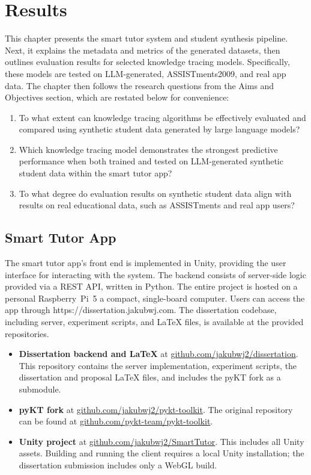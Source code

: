 \chapter{Results}

This chapter presents the smart tutor system and student synthesis pipeline. Next, it explains the metadata and metrics of the generated datasets, then outlines evaluation results for selected knowledge tracing models. Specifically, these models are tested on LLM-generated, ASSISTments2009, and real app data. The chapter then follows the research questions from the Aims and Objectives section, which are restated below for convenience:

\begin{enumerate}
    \item To what extent can knowledge tracing algorithms be effectively evaluated and compared using synthetic student data generated by large language models?
    \item Which knowledge tracing model demonstrates the strongest predictive performance when both trained and tested on LLM-generated synthetic student data within the smart tutor app?
    \item To what degree do evaluation results on synthetic student data align with results on real educational data, such as ASSISTments and real app users?
\end{enumerate}

\section{Smart Tutor App}

The smart tutor app's front end is implemented in Unity, providing the user interface for interacting with the system. The backend consists of server-side logic provided via a REST API, written in Python. The entire project is hosted on a personal Raspberry~Pi~5 a compact, single-board computer. Users can access the app through https://dissertation.jakubwj.com. The dissertation codebase, including server, experiment scripts, and LaTeX files, is available at the provided repositories.

\begin{itemize}
    \item \textbf{Dissertation backend and LaTeX} at \href{https://github.com/jakubwj2/dissertation}{github.com/jakubwj2/dissertation}. This repository contains the server implementation, experiment scripts, the dissertation and proposal \LaTeX{} files, and includes the pyKT fork as a submodule.
    \item \textbf{pyKT fork} at \href{https://github.com/jakubwj2/pykt-toolkit}{github.com/jakubwj2/pykt-toolkit}. The original repository can be found at \href{https://github.com/pykt-team/pykt-toolkit}{github.com/pykt-team/pykt-toolkit}.
    \item \textbf{Unity project} at \href{https://github.com/jakubwj2/SmartTutor}{github.com/jakubwj2/SmartTutor}. This includes all Unity assets. Building and running the client requires a local Unity installation; the dissertation submission includes only a WebGL build.
\end{itemize}

